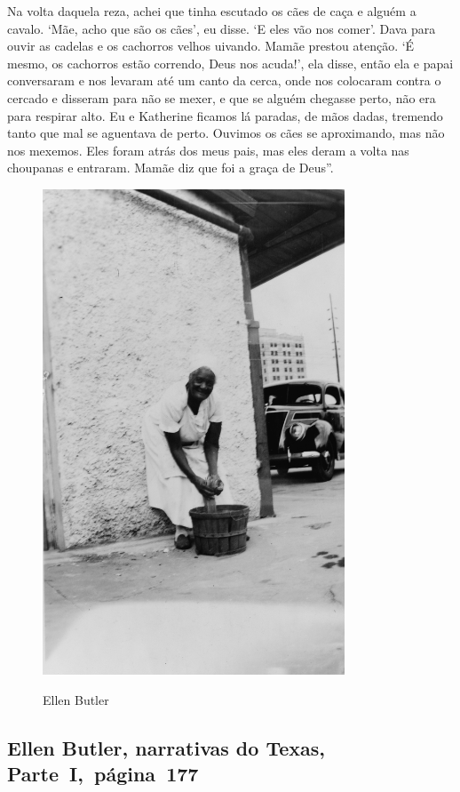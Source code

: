Na volta daquela reza, achei que tinha escutado os cães de caça e alguém
a cavalo. `Mãe, acho que são os cães', eu disse. `E eles vão nos comer'.
Dava para ouvir as cadelas e os cachorros velhos uivando. Mamãe prestou
atenção. `É mesmo, os cachorros estão correndo, Deus nos acuda!', ela
disse, então ela e papai conversaram e nos levaram até um canto da
cerca, onde nos colocaram contra o cercado e disseram para não se mexer,
e que se alguém chegasse perto, não era para respirar alto. Eu e
Katherine ficamos lá paradas, de mãos dadas, tremendo tanto que mal se
aguentava de perto. Ouvimos os cães se aproximando, mas não nos mexemos.
Eles foram atrás dos meus pais, mas eles deram a volta nas choupanas e
entraram. Mamãe diz que foi a graça de Deus''.

\begin{figure}[]
\centering
 \includegraphics[width=90mm]{./imgs/ellenbutler_recorte.jpg} \label{img18}
\caption{Ellen Butler}
\end{figure}

\subsection{Ellen Butler, narrativas do Texas, Parte~I,~página~177} \label{ref41}

